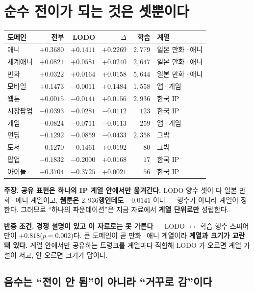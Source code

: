 \documentclass[10pt,a4paper]{article}
\newcommand{\claim}[2]{\begin{claimbox}\textbf{주장.} #1\par\smallskip
  \textcolor{gray!70}{\textbf{반증 조건.} #2}\end{claimbox}}
\begin{document}
\section{순수 전이가 되는 것은 셋뿐이다}

\begin{center}
\begin{tabular}{lrrrrl}
\toprule
도메인 & 전부 & \textbf{LODO} & $\Delta$ & 학습 & 계열 \\
\midrule
애니 & $+0.3680$ & $\mathbf{+0.1411}$ & $+0.2269$ & $2{,}779$ & 일본 만화·애니 \\
세계애니 & $+0.0821$ & $\mathbf{+0.0581}$ & $+0.0240$ & $2{,}647$ & 일본 만화·애니 \\
만화 & $+0.0322$ & $\mathbf{+0.0164}$ & $+0.0158$ & $5{,}644$ & 일본 만화·애니 \\
\midrule
모바일 & $+0.1473$ & $-0.0011$ & $+0.1484$ & $1{,}558$ & 앱·게임 \\
웹툰 & $+0.0015$ & $-0.0141$ & $+0.0156$ & $2{,}936$ & 한국 IP \\
시장팝업 & $-0.0393$ & $-0.0281$ & $-0.0112$ & $123$ & 한국 IP \\
게임 & $-0.0824$ & $-0.0711$ & $-0.0113$ & $259$ & 앱·게임 \\
펀딩 & $-0.1292$ & $-0.0859$ & $-0.0433$ & $2{,}358$ & 그밖 \\
도서 & $-0.1270$ & $-0.1461$ & $+0.0192$ & $80$ & 그밖 \\
팝업 & $-0.1832$ & $-0.2000$ & $+0.0168$ & $17$ & 한국 IP \\
아이돌 & $-0.3704$ & $-0.3725$ & $+0.0021$ & $56$ & 한국 IP \\
\bottomrule
\end{tabular}
\end{center}

\claim{\textbf{공유 표현은 하나의 IP 계열 안에서만 옮겨간다.} LODO 양수 셋이 다
일본 만화·애니 계열이고, \textbf{웹툰은 $2{,}936$행인데도 $-0.0141$} 이다 ---
행수가 아니라 계열이 정한다. 그러므로 ``하나의 파운데이션''은 지금 자료에서
\textbf{계열 단위로만} 성립한다.}
{\textbf{경쟁 설명이 있고 이 자료로는 못 가른다} --- LODO $\leftrightarrow$ 학습
행수 스피어만이 $+0.818$($p{=}0.002$)다. 큰 도메인이 곧 만화·애니 계열이라
\textbf{계열과 크기가 교란돼 있다.} 계열 안에서만 공유하는 트렁크를 계열마다
적합해 LODO 가 오르면 계열 가설이 서고, 안 오르면 크기가 답이다.}

\subsection*{음수는 ``전이 안 됨''이 아니라 ``거꾸로 감''이다}
\end{document}
